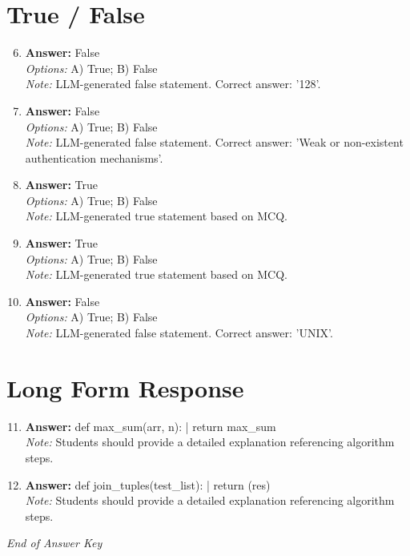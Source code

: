 \documentclass[12pt]{article}
\begin{document}
\section*{True / False}
\begin{enumerate}[label=\arabic*.]
\setcounter{enumi}{5}
\item \textbf{Answer:} False
\\ \textit{Options:} A) True; B) False
\\ \textit{Note:} LLM-generated false statement. Correct answer: '128'.
\item \textbf{Answer:} False
\\ \textit{Options:} A) True; B) False
\\ \textit{Note:} LLM-generated false statement. Correct answer: 'Weak or non-existent authentication mechanisms'.
\item \textbf{Answer:} True
\\ \textit{Options:} A) True; B) False
\\ \textit{Note:} LLM-generated true statement based on MCQ.
\item \textbf{Answer:} True
\\ \textit{Options:} A) True; B) False
\\ \textit{Note:} LLM-generated true statement based on MCQ.
\item \textbf{Answer:} False
\\ \textit{Options:} A) True; B) False
\\ \textit{Note:} LLM-generated false statement. Correct answer: 'UNIX'.
\end{enumerate}

\section*{Long Form Response}
\begin{enumerate}[label=\arabic*.]
\setcounter{enumi}{10}
\item \textbf{Answer:} def max\_sum(arr, n): | return max\_sum
\\ \textit{Note:} Students should provide a detailed explanation referencing algorithm steps.
\item \textbf{Answer:} def join\_tuples(test\_list): | return (res)
\\ \textit{Note:} Students should provide a detailed explanation referencing algorithm steps.
\end{enumerate}

\vfill
\noindent\textit{End of Answer Key}
\end{document}
